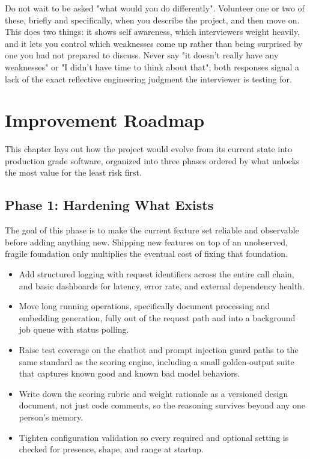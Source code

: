\documentclass[11pt,a4paper]{report}
\begin{document}
\begin{notebox}
Do not wait to be asked "what would you do differently". Volunteer one or two of these, briefly and specifically, when you describe the project, and then move on. This does two things: it shows self awareness, which interviewers weight heavily, and it lets you control which weaknesses come up rather than being surprised by one you had not prepared to discuss. Never say "it doesn't really have any weaknesses" or "I didn't have time to think about that"; both responses signal a lack of the exact reflective engineering judgment the interviewer is testing for.
\end{notebox}

\chapter{Improvement Roadmap}

This chapter lays out how the project would evolve from its current state into production grade software, organized into three phases ordered by what unlocks the most value for the least risk first.

\section{Phase 1: Hardening What Exists}

The goal of this phase is to make the current feature set reliable and observable before adding anything new. Shipping new features on top of an unobserved, fragile foundation only multiplies the eventual cost of fixing that foundation.

\begin{itemize}[leftmargin=*]
\item Add structured logging with request identifiers across the entire call chain, and basic dashboards for latency, error rate, and external dependency health.
\item Move long running operations, specifically document processing and embedding generation, fully out of the request path and into a background job queue with status polling.
\item Raise test coverage on the chatbot and prompt injection guard paths to the same standard as the scoring engine, including a small golden-output suite that captures known good and known bad model behaviors.
\item Write down the scoring rubric and weight rationale as a versioned design document, not just code comments, so the reasoning survives beyond any one person's memory.
\item Tighten configuration validation so every required and optional setting is checked for presence, shape, and range at startup.
\end{itemize}
\end{document}
